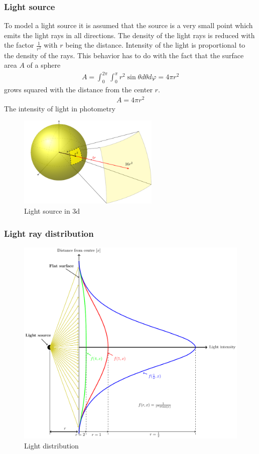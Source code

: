 \subsubsection{Light source}
To model a light source it is assumed that the source is a very small point which emits the light rays in all directions. The density of the light rays is reduced with the factor $\frac{1}{r^2}$ with $r$ being the distance. Intensity of the light is proportional to the density of the rays. This behavior has to do with the fact that the surface area $A$ of a sphere
\begin{align*}
A=\int_{0}^{2 \pi} \int_{0}^{\pi} r^{2} \sin \theta d \theta d \varphi=4 \pi r^{2}
\end{align*}
grows squared with the distance from the center $r$.
\begin{align*}
A = 4\pi r^2
\end{align*}
The intensity of light in photometry 
\begin{figure}[ht]
	\centering
	\includegraphics[width=0.6\textwidth]{2-theory/backlight/light.pdf}
	\caption{Light source in 3d\label{theory:light}}
\end{figure} 


\subsubsection{Light ray distribution}
\begin{figure}[ht]
	\centering
	\includegraphics[width=1\textwidth]{2-theory/backlight/lightsource.pdf}
	\caption{Light distribution\label{theory:lightdistribution}}
\end{figure} 
